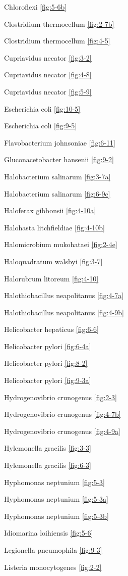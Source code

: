 \documentclass[]{tufte-book}
\begin{document}
Chloroflexi \ref{fig:5-6b}

Clostridium thermocellum \ref{fig:2-7b}

Clostridium thermocellum \ref{fig:4-5}

Cupriavidus necator \ref{fig:3-2}

Cupriavidus necator \ref{fig:4-8}

Cupriavidus necator \ref{fig:5-9}

Escherichia coli \ref{fig:10-5}

Escherichia coli \ref{fig:9-5}

Flavobacterium johnsoniae \ref{fig:6-11}

Gluconacetobacter hansenii \ref{fig:9-2}

Halobacterium salinarum \ref{fig:3-7a}

Halobacterium salinarum \ref{fig:6-9c}

Haloferax gibbonsii \ref{fig:4-10a}

Halohasta litchfieldiae \ref{fig:4-10b}

Halomicrobium mukohataei \ref{fig:2-4e}

Haloquadratum walsbyi \ref{fig:3-7}

Halorubrum litoreum \ref{fig:4-10}

Halothiobacillus neapolitanus \ref{fig:4-7a}

Halothiobacillus neapolitanus \ref{fig:4-9b}

Helicobacter hepaticus \ref{fig:6-6}

Helicobacter pylori \ref{fig:6-4a}

Helicobacter pylori \ref{fig:8-2}

Helicobacter pylori \ref{fig:9-3a}

Hydrogenovibrio crunogenus \ref{fig:2-3}

Hydrogenovibrio crunogenus \ref{fig:4-7b}

Hydrogenovibrio crunogenus \ref{fig:4-9a}

Hylemonella gracilis \ref{fig:3-3}

Hylemonella gracilis \ref{fig:6-3}

Hyphomonas neptunium \ref{fig:5-3}

Hyphomonas neptunium \ref{fig:5-3a}

Hyphomonas neptunium \ref{fig:5-3b}

Idiomarina loihiensis \ref{fig:5-6}

Legionella pneumophila \ref{fig:9-3}

Listeria monocytogenes \ref{fig:2-2}
\end{document}
